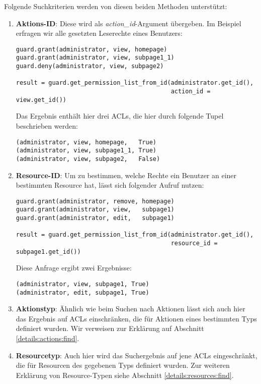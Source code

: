 Folgende Suchkriterien werden von diesen beiden Methoden unterstützt:

\begin{enumerate}
\item {\bf Aktions-ID}: Diese wird als {\it action\_id}-Argument übergeben.
Im Beispiel erfragen wir alle gesetzten Leserechte eines Benutzers:

\begin{lstlisting}
guard.grant(administrator, view, homepage)
guard.grant(administrator, view, subpage1_1)
guard.deny(administrator, view, subpage2)

result = guard.get_permission_list_from_id(administrator.get_id(),
                                           action_id = view.get_id())
\end{lstlisting}

Das Ergebnis enthält hier drei ACLs, die hier durch folgende Tupel 
beschrieben werden:

\begin{lstlisting}
(administrator, view, homepage,   True)
(administrator, view, subpage1_1, True)
(administrator, view, subpage2,   False)
\end{lstlisting}

\item {\bf Resource-ID}: Um zu bestimmen, welche Rechte ein Benutzer an 
einer bestimmten Resource hat, lässt sich folgender Aufruf nutzen:

\begin{lstlisting}
guard.grant(administrator, remove, homepage)
guard.grant(administrator, view,   subpage1)
guard.grant(administrator, edit,   subpage1)

result = guard.get_permission_list_from_id(administrator.get_id(),
                                           resource_id = subpage1.get_id())
\end{lstlisting}

Diese Anfrage ergibt zwei Ergebnisse:

\begin{lstlisting}
(administrator, view, subpage1, True)
(administrator, edit, subpage1, True)
\end{lstlisting}

\item {\bf Aktionstyp}: Ähnlich wie beim Suchen nach Aktionen lässt sich 
auch hier das Ergebnis auf ACLs einschränken, die für Aktionen eines 
bestimmten Typs definiert wurden. Wir verweisen zur Erklärung auf Abschnitt 
\ref{details:actions:find}.

\item {\bf Resourcetyp}: Auch hier wird das Suchergebnis auf jene ACLs 
eingeschränkt, die für Resourcen des gegebenen Typs definiert wurden.
Zur weiteren Erklärung von Resource-Typen siehe Abschnitt 
\ref{details:resources:find}.
\end{enumerate}

